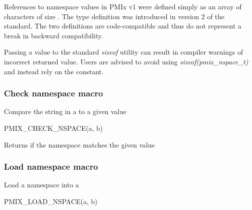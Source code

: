 \adviceuserstart
References to namespace values in \ac{PMIx} v1 were defined simply as an array of characters of size . The  type definition was introduced in version 2 of the standard. The two definitions are code-compatible and thus do not represent a break in backward compatibility.

Passing a  value to the standard \textit{sizeof} utility can result in compiler warnings of incorrect returned value. Users are advised to avoid using \textit{sizeof(pmix_nspace_t)} and instead rely on the  constant.
\adviceuserend

\subsubsection{Check namespace macro}

Compare the string in a  to a given value

\cspecificstart
\begin{codepar}
PMIX_CHECK_NSPACE(a, b)
\end{codepar}
\cspecificend

\begin{arglist}
\end{arglist}

Returns  if the namespace matches the given value

\subsubsection{Load namespace macro}

Load a namespace into a 

\cspecificstart
\begin{codepar}
PMIX_LOAD_NSPACE(a, b)
\end{codepar}
\cspecificend

\begin{arglist}
\end{arglist}

